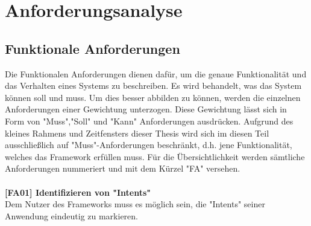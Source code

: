 \section{Anforderungsanalyse}
\label{sec:anforderungsanalyse}

\subsection{Funktionale Anforderungen}
Die Funktionalen Anforderungen dienen dafür, um die genaue Funktionalität und das Verhalten eines Systems zu beschreiben. Es wird behandelt, was das System können soll und muss. Um dies besser abbilden zu können, werden die einzelnen Anforderungen einer Gewichtung unterzogen. Diese Gewichtung lässt sich in Form von "Muss","Soll" und "Kann" Anforderungen ausdrücken. Aufgrund des kleines Rahmens und Zeitfensters dieser Thesis wird sich im diesen Teil ausschließlich auf "Muss"-Anforderungen beschränkt, d.h. jene Funktionalität, welches das Framework erfüllen muss. Für die Übersichtlichkeit werden sämtliche Anforderungen nummeriert und mit dem Kürzel "FA" versehen.
\\
\\
\textbf{[FA01] Identifizieren von "Intents"}
\\
Dem Nutzer des Frameworks muss es möglich sein, die "Intents" seiner Anwendung eindeutig zu markieren.
\\
\\


